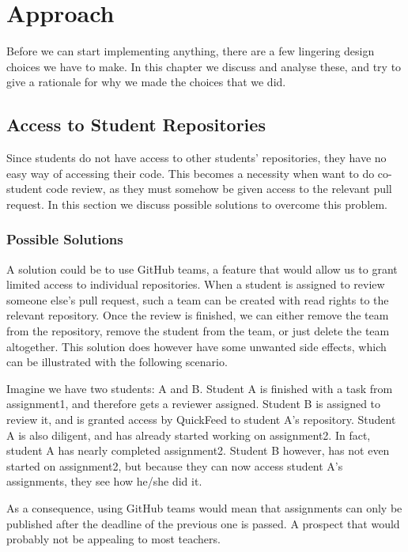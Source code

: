 
\chapter{Approach}
\label{ch:approach}

Before we can start implementing anything, there are a few lingering design choices we have to make.
In this chapter we discuss and analyse these, and try to give a rationale for why we made the choices that we did.

\section{Access to Student Repositories}

Since students do not have access to other students' repositories, they have no easy way of accessing their code.
This becomes a necessity when want to do co-student code review, as they must somehow be given access to the relevant pull request.
In this section we discuss possible solutions to overcome this problem.

\subsection{Possible Solutions}

A solution could be to use GitHub teams, a feature that would allow us to grant limited access to individual repositories.
When a student is assigned to review someone else's pull request, such a team can be created with read rights to the relevant repository.
Once the review is finished, we can either remove the team from the repository, remove the student from the team, or just delete the team altogether.
This solution does however have some unwanted side effects, which can be illustrated with the following scenario.

Imagine we have two students: A and B.
Student A is finished with a task from assignment1, and therefore gets a reviewer assigned.
Student B is assigned to review it, and is granted access by QuickFeed to student A's repository.
Student A is also diligent, and has already started working on assignment2.
In fact, student A has nearly completed assignment2.
Student B however, has not even started on assignment2, but because they can now access student A's assignments, they see how he/she did it.

As a consequence, using GitHub teams would mean that assignments can only be published after the deadline of the previous one is passed.
A prospect that would probably not be appealing to most teachers.

